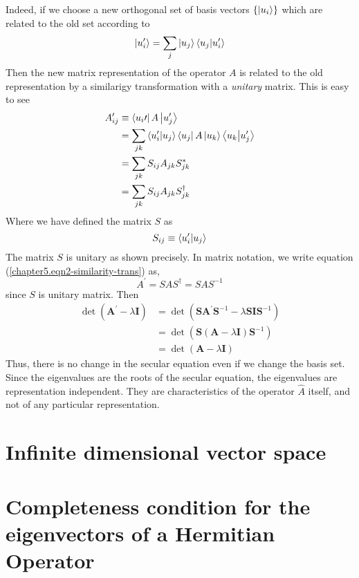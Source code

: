 	Indeed, if we choose a new orthogonal set of basis vectors $\{\ket{u_i}\}$ which are related to the old set according to 
	\begin{equation}
		\ket{u_i^\prime} = \sum_j \ket{u_j}\braket{u_j}{u_i^\prime}
	\end{equation}
	Then the new matrix representation of the operator $A$ is related to the old representation by a similarigy transformation with a \textit{unitary} matrix. This is easy to see
	\begin{eqnarray}
		A_{ij}^\prime 
		&\equiv \bra{u_i\prime} A \ket{u_j^\prime} \nonumber\\
		&= \sum_{jk} \braket{u_i^\prime}{u_j}\bra{u_j}A\ket{u_k}\braket{u_k}{u_j^\prime} \nonumber\\
		&= \sum_{jk} S_{ij} A_{jk} S_{jk}^* \nonumber\\
		&= \sum_{jk} S_{ij} A_{jk} S_{jk}^\dagger
		\label{chapter5.eqn2-similarity-trans}
	\end{eqnarray}
	Where we have defined the matrix $S$ as
	\begin{equation}
		S_{ij} \equiv \braket{u_i^\prime}{u_j}
	\end{equation}
	The matrix $S$ is unitary as shown precisely. In matrix notation, we write equation (\ref{chapter5.eqn2-similarity-trans}) as,
	\begin{equation}
		A^\prime = S A S^\dagger = S A S^{-1}
	\end{equation}
	since $S$ is unitary matrix. Then
	\begin{eqnarray}
		\det(\mathbf{A}^\prime - \lambda \mathbf{I}) 
		&= \det(\mathbf{S}\mathbf{A}^\prime \mathbf{S}^{-1} - \lambda \mathbf{S} \mathbf{I} \mathbf{S}^{-1}) \nonumber \\
		&= \det(\mathbf{S}(\mathbf{A} - \lambda \mathbf{I}) \mathbf{S}^{-1})\nonumber \\
		&= \det(\mathbf{A} - \lambda \mathbf{I})
	\end{eqnarray}
	Thus, there is no change in the secular equation even if we change the basis set. Since the eigenvalues are the roots of the secular equation, the eigenvalues are representation independent. They are characteristics of the operator $\hat{A}$ itself, and not of any particular representation.\\
	
	
	\section{Infinite dimensional vector space}
	\section{Completeness condition for the eigenvectors of a Hermitian Operator}
	
